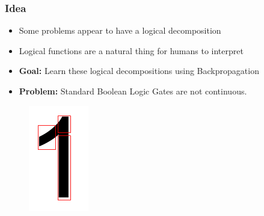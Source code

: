 \documentclass[]{beamer}
\begin{document}
\begin{frame}
\frametitle{Idea}

\begin{itemize}
\item Some problems appear to have a logical decomposition 
\item Logical functions are a natural thing for humans to interpret
\item \textbf{Goal:} Learn these logical decompositions using Backpropagation
\item \textbf{Problem:} Standard Boolean Logic Gates are not continuous.
\end{itemize}

\begin{figure}
\centering
	\begin{minipage}[b]{0.2\textwidth}
		\includegraphics[width=\textwidth]{Images/DigitDecomp.png}
	\end{minipage}
	\hfill
\end{figure}


\end{frame}
\end{document}
